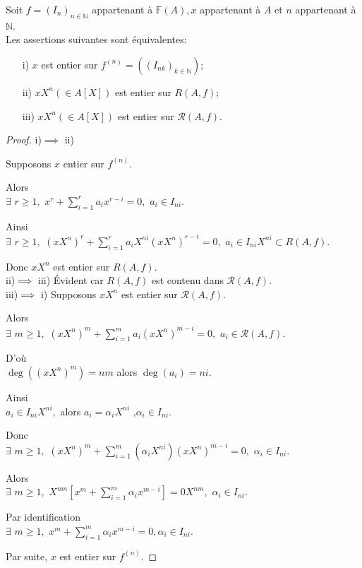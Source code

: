 \begin{maproposition}
	\label{maprop1}
	Soit $f=(I_n)_{n \in \mathbb{N}} $ appartenant à $ \mathbb{F}(A), x $ appartenant à $ A $ et $n $ appartenant à $ \mathbb{N}$.\\
	Les assertions suivantes sont équivalentes: 
	\begin{enumerate}
		\item[i)] $x$ est entier sur $f^{(n)}=((I_{nk})_{k \in \mathbb{N}})$;
		\item[ii)] $xX^n(\in A[X])$ est entier sur $R(A,f)$;
		\item[iii)] $xX^n(\in A[X])$ est entier sur $ \mathcal{R}(A,f)$.
	\end{enumerate}
	\begin{proof}
		i)$\implies$ ii)
		
		Supposons $x$ entier sur $f^{(n)}$.
		
		Alors \\ 
		$\exists$  $r\geq 1,$ $x^{r}+\sum\limits_{i=1}^{r}a_{i}x^{r-i}=0,$ $a_{i}\in I_{ni}$.
		
		Ainsi \\
		$\exists$  $r\geq 1,$ $(xX^{n})^{r}+\sum
		\limits_{i=1}^{r}a_{i}X^{ni}(xX^{n})^{r-i}=0,$ $a_{i}\in I_{ni} X^{ni} \subset R(A,f)$.
		
		Donc $xX^{n}$ est entier sur $R(A,f).$ \\
		
		ii)$\implies$ iii) Évident car $R(A,f)$ est contenu dans $  \mathcal{R}(A,f).$ \\
		iii)$\implies$ i) Supposons $xX^{n}$ est entier sur $\mathcal{R}(A,f).$
		
		Alors \\ $\exists$  $m\geq 1,$ $(xX^{n})^{m}+\sum\limits_{i=1}^{m}a_{i}(xX^{n})^{m-i}=0,$ $a_{i}\in \mathcal{R}(A,f)$.
		
		D'où \\ $\deg ((xX^{n})^{m})=nm$ alors $\deg (a_{i})=ni.$
		
		Ainsi \\ $a_{i}\in I_{ni}X^{ni},$ alors $a_{i}=\alpha _{i}X^{ni}$ ,$\alpha _{i}\in I_{ni}$.
		
		Donc \\ $\exists$  $m\geq 1,$ $(xX^{n})^{m}+\sum\limits_{i=1}^{m}(\alpha
		_{i}X^{ni})(xX^{n})^{m-i}=0,$ $\alpha _{i}\in I_{ni}$.
		
		Alors\\ $\exists$  $m\geq 1,$ $X^{nm}[x^{m}+\sum\limits_{i=1}^{m}\alpha
		_{i}x^{m-i}]=0X^{nm},$ $\alpha _{i}\in I_{ni}$.
		
		Par identification\\ $\exists$  $m\geq 1,$ $ x^{m}+\sum\limits_{i=1}^{m}\alpha _{i}x^{m-i}=0,\alpha _{i}\in I_{ni}$.
		
		Par suite, $x$ est entier sur $f^{(n)}$.
	\end{proof}
\end{maproposition}
